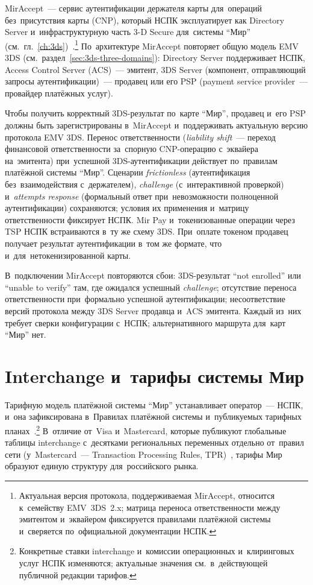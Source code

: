 MirAccept~--- сервис аутентификации держателя карты для~операций
без~присутствия карты (CNP), который НСПК эксплуатирует как Directory Server
и~инфраструктурную часть 3-D Secure для~системы \enquote{Мир}
(см.~гл.~\ref{ch:3ds})~\cite{nspk-miraccept}.\footnote{Актуальная версия
  протокола, поддерживаемая MirAccept, относится к~семейству EMV~3DS~2.x; матрица
  переноса ответственности между эмитентом и~эквайером фиксируется правилами
платёжной системы и~сверяется по~официальной документации НСПК.} По~архитектуре
MirAccept повторяет общую модель EMV 3DS
(см.~раздел~\ref{sec:3ds-three-domains}): Directory Server поддерживает НСПК,
Access Control Server (ACS)~--- эмитент, 3DS Server (компонент, отправляющий
запросы аутентификации)~--- продавец или его PSP (payment service provider~--- провайдер платёжных услуг).

Чтобы получить корректный 3DS-результат по~карте \enquote{Мир}, продавец и~его
PSP должны быть зарегистрированы в~MirAccept и~поддерживать актуальную версию
протокола EMV 3DS. Перенос ответственности (\textit{liability shift}~---
  переход финансовой ответственности за~спорную CNP-операцию с~эквайера
на~эмитента) при~успешной 3DS-аутентификации действует
по~правилам платёжной системы \enquote{Мир}. Сценарии \textit{frictionless}
(аутентификация без~взаимодействия с~держателем), \textit{challenge}
(с~интерактивной проверкой) и~\textit{attempts response} (формальный ответ
при~невозможности полноценной аутентификации) сохраняются; условия их
применения и~матрицу ответственности фиксирует НСПК. Mir Pay и~токенизованные
операции через TSP НСПК встраиваются в~ту же схему 3DS. При~оплате токеном
продавец получает результат аутентификации в~том же формате, что
и~для~нетокенизированной карты.

В~подключении MirAccept повторяются сбои: 3DS-результат \enquote{not
enrolled} или \enquote{unable to verify} там, где ожидался успешный
\textit{challenge}; отсутствие переноса ответственности при~формально успешной
аутентификации; несоответствие версий протокола между 3DS Server продавца и~ACS
эмитента. Каждый из~них требует сверки конфигурации с~НСПК; альтернативного
маршрута для~карт \enquote{Мир} нет.

\section{Interchange и~тарифы системы Мир}\label{sec:mir-interchange}

Тарифную модель платёжной системы \enquote{Мир} устанавливает оператор~---
НСПК, и~она зафиксирована в~Правилах платёжной системы и~публикуемых тарифных
планах~\cite{nspk-mir-rules,nspk-mir-tariffs}.\footnote{Конкретные ставки
  interchange и~комиссии операционных и~клиринговых услуг НСПК изменяются;
актуальные значения см.~в~действующей публичной редакции тарифов.}
В~отличие от~Visa и~Mastercard, которые публикуют глобальные таблицы
interchange с~десятками региональных переменных отдельно от~правил сети
(у~Mastercard~--- Transaction Processing Rules, TPR)~\cite{mc-tpr,mc-interchange-us},
тарифы Мир образуют единую структуру для~российского рынка.

